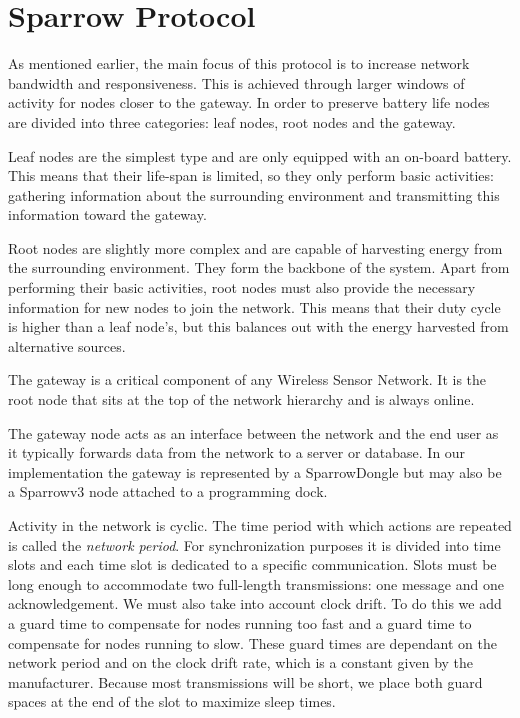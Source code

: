 
\chapter{Sparrow Protocol}

As mentioned earlier, the main focus of this protocol is to increase network
bandwidth and responsiveness. This is achieved through larger windows of
activity for nodes closer to the gateway. In order to preserve battery life
nodes are divided into three categories: leaf nodes, root nodes and the
gateway. 

Leaf nodes are the simplest type and are only equipped with an
on-board battery. This means that their life-span is limited, so they 
only perform basic activities: gathering information about the surrounding
environment and transmitting this information toward the gateway. 

Root nodes are slightly more complex and are capable of harvesting energy from
the surrounding environment. They form the backbone of the system. Apart from
performing their basic activities, root nodes must also provide the necessary
information for new nodes to join the network. This means that their duty cycle
is higher than a leaf node's, but this balances out with the energy harvested
from alternative sources.

The gateway is a critical component of any Wireless Sensor Network. It is the
root node that sits at the top of the network hierarchy and is always online.

The gateway node acts as an interface between the network and the end user as
it typically forwards data from the network to a server or database. In our
implementation the gateway is represented by a SparrowDongle but may also be a
Sparrowv3 node attached to a programming dock.

Activity in the network is cyclic. The time period with which actions are
repeated is called the \emph{network period}. For synchronization purposes it
is divided into time slots and each time slot is dedicated to a specific
communication. Slots must be long enough to accommodate two full-length
transmissions: one message and one acknowledgement. We must also take into
account clock drift. To do this we add a guard time to compensate for nodes running too
fast and a guard time to compensate for nodes running to slow. These guard times are
dependant on the network period and on the clock drift rate, which is a constant given by the
manufacturer. Because most transmissions will be short,
we place both guard spaces at the end of the slot to maximize sleep times.

